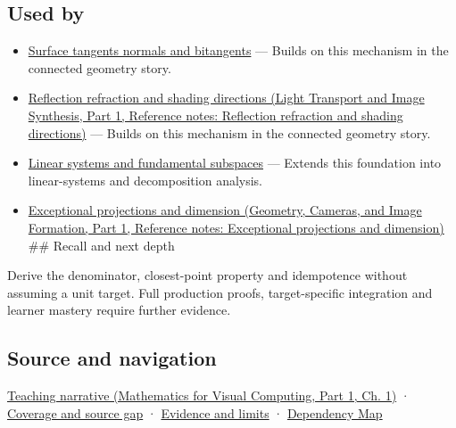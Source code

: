 \subsection{Used by}\label{appendix-505a502c372a-used-by}

\hypertarget{appendix-505a502c372a-used-by}{}

\begin{itemize}
\item
  \hyperref[appendix-e31893dec985]{Surface tangents normals and bitangents} --- Builds on this mechanism in the connected geometry story.
\item
  \href{../04-Light-Transport-and-Image-Synthesis-P01/main.pdf\#appendix-44e00863b4d5}{Reflection refraction and shading directions (Light Transport and Image Synthesis, Part 1, Reference notes: Reflection refraction and shading directions)} --- Builds on this mechanism in the connected geometry story.
\item
  \hyperref[appendix-8572a4a060c1]{Linear systems and fundamental subspaces} --- Extends this foundation into linear-systems and decomposition analysis.
\item
  \href{../03-Geometry-Cameras-and-Image-Formation-P01/main.pdf\#appendix-3c73f7862157}{Exceptional projections and dimension (Geometry, Cameras, and Image Formation, Part 1, Reference notes: Exceptional projections and dimension)} \#\# Recall and next depth
\end{itemize}

Derive the denominator, closest-point property and idempotence without assuming a unit target. Full production proofs, target-specific integration and learner mastery require further evidence.

\subsection{Source and navigation}\label{appendix-505a502c372a-source-and-navigation}

\hypertarget{appendix-505a502c372a-source-and-navigation}{}

\href{../02-Mathematics-for-Visual-Computing-P01/main.pdf\#01-foundations-i-ch017-projection-separates-useful-movement-from-sideways-movement}{Teaching narrative (Mathematics for Visual Computing, Part 1, Ch. 1)} · \hyperref[appendix-fd090d982a15-phase-6---parts-501-600]{Coverage and source gap} · \hyperref[appendix-a103e7846d21-phase-6---source-analysis-and-verification]{Evidence and limits} · \hyperref[appendix-4ad47bdd269a]{Dependency Map}

